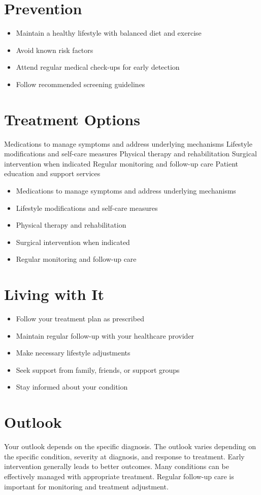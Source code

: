 \section{Prevention}
\begin{itemize}[noitemsep]
  \item Maintain a healthy lifestyle with balanced diet and exercise
  \item Avoid known risk factors
  \item Attend regular medical check-ups for early detection
  \item Follow recommended screening guidelines
\end{itemize}
\section{Treatment Options}
Medications to manage symptoms and address underlying mechanisms Lifestyle modifications and self-care measures Physical therapy and rehabilitation Surgical intervention when indicated Regular monitoring and follow-up care Patient education and support services

\begin{itemize}[noitemsep]
  \item Medications to manage symptoms and address underlying mechanisms
  \item Lifestyle modifications and self-care measures
  \item Physical therapy and rehabilitation
  \item Surgical intervention when indicated
  \item Regular monitoring and follow-up care
\end{itemize}
\section{Living with It}
\begin{itemize}[noitemsep]
  \item Follow your treatment plan as prescribed
  \item Maintain regular follow-up with your healthcare provider
  \item Make necessary lifestyle adjustments
  \item Seek support from family, friends, or support groups
  \item Stay informed about your condition
\end{itemize}
\section{Outlook}
Your outlook depends on the specific diagnosis. The outlook varies depending on the specific condition, severity at diagnosis, and response to treatment. Early intervention generally leads to better outcomes. Many conditions can be effectively managed with appropriate treatment. Regular follow-up care is important for monitoring and treatment adjustment.
